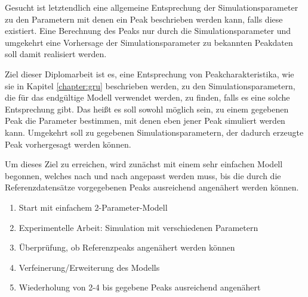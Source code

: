 
Gesucht ist letztendlich eine allgemeine Entsprechung der Simulationsparameter zu den Parametern mit denen ein Peak beschrieben werden kann, falls diese existiert. Eine Berechnung des Peaks nur durch die Simulationsparameter und umgekehrt eine Vorhersage der Simulationsparameter zu bekannten Peakdaten soll damit realisiert werden.

Ziel dieser Diplomarbeit ist es, eine Entsprechung von Peakcharakteristika, wie sie in Kapitel \ref{chapter:gru} beschrieben werden, zu den Simulationsparametern, die für das endgültige Modell verwendet werden, zu finden, falls es eine solche Entsprechung gibt.
Das heißt es soll sowohl möglich sein, zu einem gegebenen Peak die Parameter bestimmen, mit denen eben jener Peak simuliert werden kann. Umgekehrt soll zu gegebenen Simulationsparametern, der dadurch erzeugte Peak vorhergesagt werden können.

Um dieses Ziel zu erreichen, wird zunächst mit einem sehr einfachen Modell begonnen, welches nach und nach angepasst werden muss, bis die durch die Referenzdatensätze vorgegebenen Peaks ausreichend angenähert werden können.

\begin{enumerate}
 \item Start mit einfachem 2-Parameter-Modell
 \item Experimentelle Arbeit: Simulation mit verschiedenen Parametern
 \item Überprüfung, ob Referenzpeaks angenähert werden können
 \item Verfeinerung/Erweiterung des Modells
 \item Wiederholung von 2-4 bis gegebene Peaks ausreichend angenähert
\end{enumerate}

